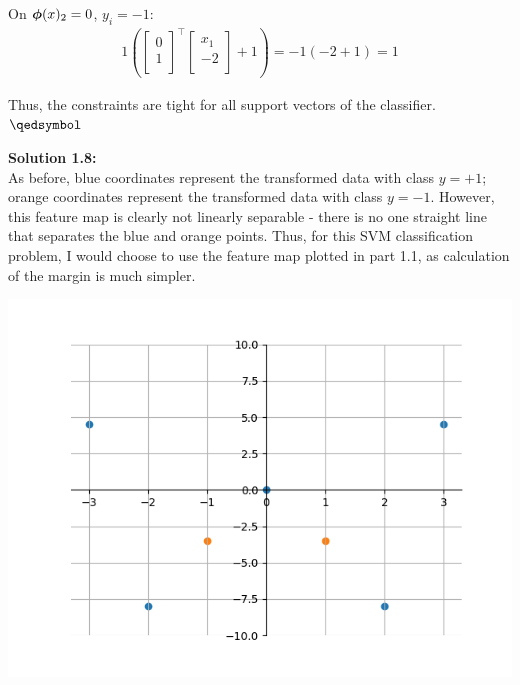 \documentclass[submit]{harvardml}
\begin{document}
On $\boldsymbol{\phi}(x)_2 = 0$, $y_i = -1$:
\begin{align*}
    1\left(\begin{bmatrix} 0\\ 1\\ \end{bmatrix}^\top \begin{bmatrix} x_1\\ -2\\ \end{bmatrix} + 1\right) = -1(-2+1) = 1
\end{align*}

Thus, the constraints are tight for all support vectors of the classifier. $\qedsymbol$

\noindent\textbf{Solution 1.8:}\\
As before, blue coordinates represent the transformed data with class $y = +1$; orange coordinates represent the transformed data with class $y = -1$. However, this feature map is clearly not linearly separable - there is no one straight line that separates the blue and orange points. Thus, for this SVM classification problem, I would choose to use the feature map plotted in part 1.1, as calculation of the margin is much simpler.
\begin{center}
    \includegraphics[scale=0.6]{1.8.png}
\end{center}

\end{document}
